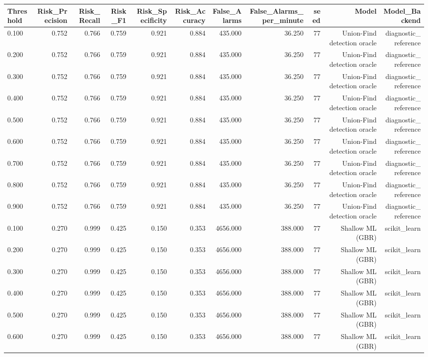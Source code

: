 \begin{tabular}{lrrrrrrrrrr}
\toprule
Threshold & Risk\_Precision & Risk\_Recall & Risk\_F1 & Risk\_Specificity & Risk\_Accuracy & False\_Alarms & False\_Alarms\_per\_minute & seed & Model & Model\_Backend \\
\midrule
0.100 & 0.752 & 0.766 & 0.759 & 0.921 & 0.884 & 435.000 & 36.250 & 77 & Union-Find detection oracle & diagnostic\_reference \\
0.200 & 0.752 & 0.766 & 0.759 & 0.921 & 0.884 & 435.000 & 36.250 & 77 & Union-Find detection oracle & diagnostic\_reference \\
0.300 & 0.752 & 0.766 & 0.759 & 0.921 & 0.884 & 435.000 & 36.250 & 77 & Union-Find detection oracle & diagnostic\_reference \\
0.400 & 0.752 & 0.766 & 0.759 & 0.921 & 0.884 & 435.000 & 36.250 & 77 & Union-Find detection oracle & diagnostic\_reference \\
0.500 & 0.752 & 0.766 & 0.759 & 0.921 & 0.884 & 435.000 & 36.250 & 77 & Union-Find detection oracle & diagnostic\_reference \\
0.600 & 0.752 & 0.766 & 0.759 & 0.921 & 0.884 & 435.000 & 36.250 & 77 & Union-Find detection oracle & diagnostic\_reference \\
0.700 & 0.752 & 0.766 & 0.759 & 0.921 & 0.884 & 435.000 & 36.250 & 77 & Union-Find detection oracle & diagnostic\_reference \\
0.800 & 0.752 & 0.766 & 0.759 & 0.921 & 0.884 & 435.000 & 36.250 & 77 & Union-Find detection oracle & diagnostic\_reference \\
0.900 & 0.752 & 0.766 & 0.759 & 0.921 & 0.884 & 435.000 & 36.250 & 77 & Union-Find detection oracle & diagnostic\_reference \\
0.100 & 0.270 & 0.999 & 0.425 & 0.150 & 0.353 & 4656.000 & 388.000 & 77 & Shallow ML (GBR) & scikit\_learn \\
0.200 & 0.270 & 0.999 & 0.425 & 0.150 & 0.353 & 4656.000 & 388.000 & 77 & Shallow ML (GBR) & scikit\_learn \\
0.300 & 0.270 & 0.999 & 0.425 & 0.150 & 0.353 & 4656.000 & 388.000 & 77 & Shallow ML (GBR) & scikit\_learn \\
0.400 & 0.270 & 0.999 & 0.425 & 0.150 & 0.353 & 4656.000 & 388.000 & 77 & Shallow ML (GBR) & scikit\_learn \\
0.500 & 0.270 & 0.999 & 0.425 & 0.150 & 0.353 & 4656.000 & 388.000 & 77 & Shallow ML (GBR) & scikit\_learn \\
0.600 & 0.270 & 0.999 & 0.425 & 0.150 & 0.353 & 4656.000 & 388.000 & 77 & Shallow ML (GBR) & scikit\_learn \\

\end{tabular}
